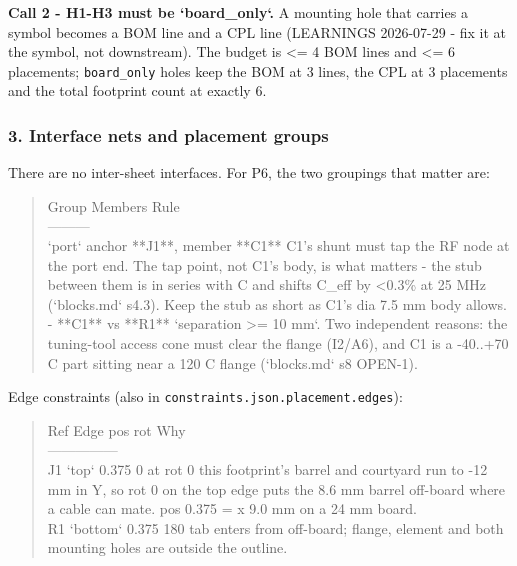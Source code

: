 \documentclass[11pt,a4paper]{article}
\begin{document}
\textbf{Call 2 - H1-H3 must be `board\_only`.} A mounting hole that carries a symbol becomes a BOM line and a CPL line (LEARNINGS 2026-07-29 - fix it at the symbol, not downstream). The budget is \textless{}= 4 BOM lines and \textless{}= 6 placements; \texttt{board\_only} holes keep the BOM at 3 lines, the CPL at 3 placements and the total footprint count at exactly 6.

\subsubsection*{3. Interface nets and placement groups}
There are no inter-sheet interfaces. For P6, the two groupings that matter are:

\begin{quote}\small\ttfamily\raggedright
\textbar{} Group \textbar{} Members \textbar{} Rule \textbar{}\\
\textbar{}---\textbar{}---\textbar{}---\textbar{}\\
\textbar{} `port` \textbar{} anchor {*}{*}J1{*}{*}, member {*}{*}C1{*}{*} \textbar{} C1's shunt must tap the RF node at the port end. The tap point, not C1's body, is what matters - the stub between them is in series with C and shifts C\_eff by \textless{}0.3\% at 25 MHz (`blocks.md` s4.3). Keep the stub as short as C1's dia 7.5 mm body allows. \textbar{}\\
\textbar{} - \textbar{} {*}{*}C1{*}{*} vs {*}{*}R1{*}{*} \textbar{} `separation \textgreater{}= 10 mm`. Two independent reasons: the tuning-tool access cone must clear the flange (I2/A6), and C1 is a -40..+70 C part sitting near a 120 C flange (`blocks.md` s8 OPEN-1). \textbar{}
\end{quote}
Edge constraints (also in \texttt{constraints.json.placement.edges}):

\begin{quote}\small\ttfamily\raggedright
\textbar{} Ref \textbar{} Edge \textbar{} pos \textbar{} rot \textbar{} Why \textbar{}\\
\textbar{}---\textbar{}---\textbar{}---\textbar{}---\textbar{}---\textbar{}\\
\textbar{} J1 \textbar{} `top` \textbar{} 0.375 \textbar{} 0 \textbar{} at rot 0 this footprint's barrel and courtyard run to -12 mm in Y, so rot 0 on the top edge puts the 8.6 mm barrel off-board where a cable can mate. pos 0.375 = x 9.0 mm on a 24 mm board. \textbar{}\\
\textbar{} R1 \textbar{} `bottom` \textbar{} 0.375 \textbar{} 180 \textbar{} tab enters from off-board; flange, element and both mounting holes are outside the outline. \textbar{}
\end{quote}
\end{document}
